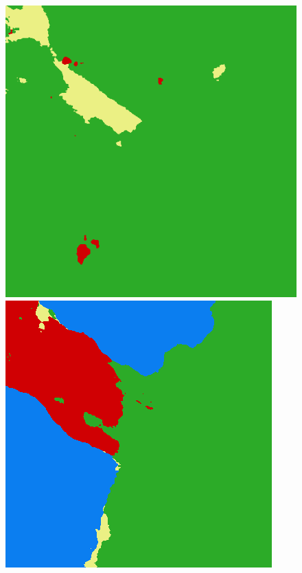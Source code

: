 \begin{figure}
    \includegraphics[width=\UnetPredictionsImageWidth]{images/unet/unet-18D/138625-prediction} \hfill
    \includegraphics[width=\UnetPredictionsImageWidth]{images/unet/unet-23/138625-prediction} \hfill

\end{figure}
